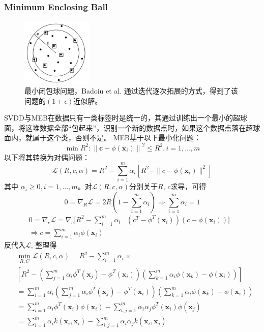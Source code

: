 \documentclass[UTF8, fleqn,10pt]{SelfArx} %
\begin{document}
		\subsubsection{Minimum Enclosing Ball}
		\begin{figure}[H]
			\centering
			\includegraphics[width=0.3\textwidth]{figure/meb}
			\caption{最小闭包球问题，Badoiu et al. 通过迭代逐次拓展的方式，得到了该问题的$(1 + \epsilon)$近似解。}
		\end{figure}
		SVDD与MEB在数据只有一类标签时是统一的，其通过训练出一个最小的超球面，将这堆数据全部“包起来”，识别一个新的数据点时，如果这个数据点落在超球面内，就属于这个类，否则不是。
		MEB基于以下最小化问题：
		\begin{equation}
		\min R^{2}:\left\|\mathbf{c}-\phi\left(\mathbf{x}_{i}\right)\right\|^{2} \leq R^{2}, i=1, \ldots, m
		\end{equation}
		以下将其转换为对偶问题：
		$$
		\mathcal{L}(R, c, \alpha)= R^2 - \sum_{i=1}^{m}\alpha_{i}\left[R^2 - \parallel c - \phi(\mathbf{x}_{i})\parallel^2 \right]
		$$
		其中 $\alpha_{i} \geq 0, i = 1, \ldots, m$。对$\mathcal{L}(R, c, \alpha)$分别关于$R$, $c$求导，可得
		$$0=\nabla_{R} \mathcal{L}=2R(1-\sum_{i=1}^{m}\alpha_{i}) \Rightarrow \sum_{i=1}^{m}\alpha_{i} = 1$$
		$$
		\begin{aligned}
		0=\nabla_{c} \mathcal{L}= \nabla_{c}[R^2 - \sum_{i=1}^{m}\alpha_{i}&\left(c^T - \phi^T(\mathbf{x}_{i})\right) \left(c - \phi(\mathbf{x}_{i})\right) ] &\\\Rightarrow c = \sum_{i=1}^{m}\alpha_{i}\phi(\mathbf{x}_{i})
		\end{aligned}
		$$
		反代入$\mathcal{L}$, 整理得
		$$
		\begin{aligned} &\min _{R, C}\mathcal{L}(R, c, \alpha)= 
		R^2 - \sum_{i=1}^{m}\alpha_{i}\times\\&\left[R^2 - \left(\sum_{j=1}^{m}\alpha_{i}\phi^T(\mathbf{x}_{j}) - \phi^T(\mathbf{x}_{i})\right)\left(\sum_{k=1}^{m}\alpha_{i}\phi(\mathbf{x}_{k}) - \phi(\mathbf{x}_{i})\right)\right]\\&
		=\sum_{i=1}^{m}\alpha_{i}\left(\sum_{j=1}^{m}\alpha_{i}\phi^T(\mathbf{x}_{j}) - \phi^T(\mathbf{x}_{i})\right)\left(\sum_{k=1}^{m}\alpha_{i}\phi(\mathbf{x}_{k}) - \phi(\mathbf{x}_{i})\right) \\&
		=\sum_{i=1}^{m}\alpha_{i}\phi^T(\mathbf{x}_{i})\phi(\mathbf{x}_{i}) - \sum_{i,j=1}^{m}\alpha_{i}\alpha_{j}\phi^T(\mathbf{x}_{i})\phi(\mathbf{x}_{j}) \\&
		=\sum_{i=1}^{m} \alpha_{i} k\left(\mathbf{x}_{i}, \mathbf{x}_{i}\right)-\sum_{i, j=1}^{m} \alpha_{i} \alpha_{j} k\left(\mathbf{x}_{i}, \mathbf{x}_{j}\right)\end{aligned}
		$$
\end{document}
